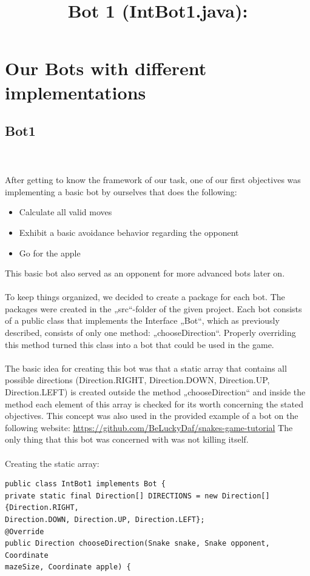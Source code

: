 \documentclass[a4paper,12pt]{article}
\begin{document}
\section{Our Bots with different implementations}
\subsection{Bot1}
\title{Bot 1 (IntBot1.java):}\\
\\
After getting to know the framework of our task, one of our first objectives was implementing a
basic bot by ourselves that does the following:\\
\begin{itemize}
\item Calculate all valid moves
\item Exhibit a basic avoidance behavior regarding the opponent
\item Go for the apple
\end{itemize}
This basic bot also served as an opponent for more advanced bots later on.\\
\\
To keep things organized, we decided to create a package for each bot. The packages were created
in the „src“-folder of the given project. Each bot consists of a public class that implements the
Interface „Bot“, which as previously described, consists of only one method: „chooseDirection“.
Properly overriding this method turned this class into a bot that could be used in the game.
\\
\\
The basic idea for creating this bot was that a static array that contains all possible directions
(Direction.RIGHT, Direction.DOWN, Direction.UP, Direction.LEFT) is created outside the method
„chooseDirection“ and inside the method each element of this array is checked for its worth
concerning the stated objectives. This concept was also used in the provided example of  a bot  on the following website: \url{https://github.com/BeLuckyDaf/snakes-game-tutorial} The only thing that this bot was concerned with was not killing itself.\\
\\
Creating the static array:
\begin{verbatim}
public class IntBot1 implements Bot {
private static final Direction[] DIRECTIONS = new Direction[]{Direction.RIGHT,
Direction.DOWN, Direction.UP, Direction.LEFT};
@Override
public Direction chooseDirection(Snake snake, Snake opponent, Coordinate
mazeSize, Coordinate apple) {
\end{verbatim}
\end{document}

